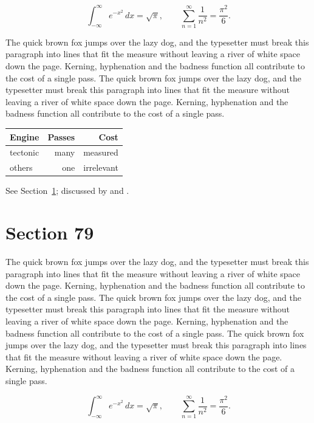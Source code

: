 \documentclass{article}
\begin{document}
\begin{equation}\label{eq:78}
\int_{-\infty}^{\infty} e^{-x^{2}}\,dx = \sqrt{\pi}, \qquad
\sum_{n=1}^{\infty} \frac{1}{n^{2}} = \frac{\pi^{2}}{6}.
\end{equation}

The quick brown fox jumps over the lazy dog, and the typesetter must break this paragraph into lines that fit the measure without leaving a river of white space down the page. Kerning, hyphenation and the badness function all contribute to the cost of a single pass. The quick brown fox jumps over the lazy dog, and the typesetter must break this paragraph into lines that fit the measure without leaving a river of white space down the page. Kerning, hyphenation and the badness function all contribute to the cost of a single pass. 

\begin{center}
\begin{tabular}{lrr}
\toprule
Engine & Passes & Cost \\
\midrule
tectonic & many & measured \\
others & one & irrelevant \\
\bottomrule
\end{tabular}
\end{center}

See Section~\ref{sec:79}; discussed by \textcite{k4} and \textcite{l1}.
\section{Section 79}
\label{sec:79}
The quick brown fox jumps over the lazy dog, and the typesetter must break this paragraph into lines that fit the measure without leaving a river of white space down the page. Kerning, hyphenation and the badness function all contribute to the cost of a single pass. The quick brown fox jumps over the lazy dog, and the typesetter must break this paragraph into lines that fit the measure without leaving a river of white space down the page. Kerning, hyphenation and the badness function all contribute to the cost of a single pass. The quick brown fox jumps over the lazy dog, and the typesetter must break this paragraph into lines that fit the measure without leaving a river of white space down the page. Kerning, hyphenation and the badness function all contribute to the cost of a single pass. 

\begin{equation}\label{eq:79}
\int_{-\infty}^{\infty} e^{-x^{2}}\,dx = \sqrt{\pi}, \qquad
\sum_{n=1}^{\infty} \frac{1}{n^{2}} = \frac{\pi^{2}}{6}.
\end{equation}
\end{document}
